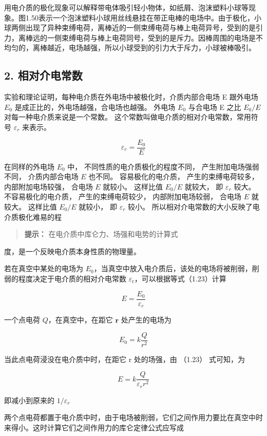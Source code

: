 用电介质的极化现象可以解释带电体吸引轻小物体，如纸屑、泡沫塑料小球等现象。图1.50表示一个泡沫塑料小球用丝线悬挂在带正电棒的电场中。由于极化，小球两侧出现了异种束缚电荷，离棒近的一侧束缚电荷与棒上电荷异号，受到的是引力，离棒远的一侧束缚电荷与棒上电荷同号，受到的是斥力。因棒周围的电场是不均匀的，离棒越近，电场越强，所以小球受到的引力大于斥力，小球被棒吸引。

\subsection{2. 相对介电常数}\label{ux76f8ux5bf9ux4ecbux7535ux5e38ux6570}

实验和理论证明，每种电介质在外电场中被极化时，介质内部合电场 E 跟外电场
\(E_{0}\) 是成正比的，外电场越强，合电场也越强。 外电场 \(E_{0}\)
与合电场 E 之比 \(E_{0}/E\) 对每一种电介质来说是一个常数。
这个常数叫做电介质的相对介电常数，常用符号 \(\varepsilon_{r}\) 来表示。

\[
\varepsilon_{r} = \frac{E_{0}}{E} \tag{1.23}
\]

在同样的外电场 \(E_0\) 中， 不同性质的电介质极化的程度不同，
产生附加电场强弱不同， 介质内部合电场 \(E\) 也不同。 容易极化的电介质，
产生的束缚电荷较多， 内部附加电场较强， 合电场 \(E\) 就较小。 这样比值
\(E_0 / E\) 就较大， 即 \(\varepsilon_r\) 较大。 不容易极化的电介质，
产生的束缚电荷较少， 内部附加电场较弱， 合电场 \(E\) 就较大。 这样比值
\(E_0 / E\) 就较小， 即 \(\varepsilon_r\) 较小。
所以相对介电常数的大小反映了电介质极化难易的程

\begin{quote}
\textbf{提示：} 在电介质中库仑力、场强和电势的计算式
\end{quote}

度，是一个反映电介质本身性质的物理量。

若在真空中某处的电场为
\(E_{0}\)，当真空中放入电介质后，该处的电场将被削弱，削弱的程度决定于电介质的相对介电常数
\(\varepsilon_{\mathrm{r}}\)，可以根据等式（1.23）计算

\[
E = \frac{E_{0}}{\varepsilon_{r}}
\]

一个点电荷 \(Q\)，在真空中，在距它 \(\pmb{r}\) 处产生的电场为

\[
E_{0} = k \frac{Q}{r^{2}}
\]

当此点电荷浸没在电介质中时，在距它 r 处的场强，由 （1.23） 式可知，为

\[
E = k \frac{Q}{\varepsilon_{r} r^{2}} \tag{1.24}
\]

即减小到原来的 \(1 / \varepsilon_{r}\)

两个点电荷都置于电介质中时，由于电场被削弱，它们之间作用力要比在真空中时来得小。这时计算它们之间作用力的库仑定律公式应写成

